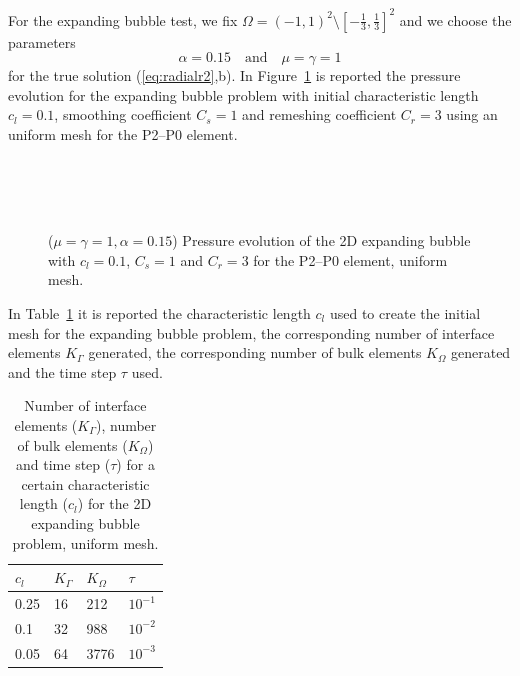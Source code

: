 \documentclass[a4paper,12pt,onecolumn]{article}
\begin{document}
For the expanding bubble test, we fix $\Omega = (-1,1)^2 \setminus [-\frac13,\frac13]^2$ and we choose the parameters
\begin{equation*}
\alpha = 0.15 \quad\text{and}\quad \mu = \gamma = 1
\end{equation*}
for the true solution (\ref{eq:radialr2},b). In Figure~\ref{fig:expanding_bubble} is reported the pressure evolution for the expanding bubble problem with initial characteristic length $c_l=0.1$, smoothing coefficient $C_s=1$ and remeshing coefficient $C_r=3$ using an uniform mesh for the P2--P0 element.

\begin{figure}[htbp]
  \centering
  \\
  \quad
  \\
  \quad
  \\
  \caption{($\mu=\gamma=1,\alpha = 0.15$) Pressure evolution of the 2D expanding bubble with $c_l=0.1$, $C_s=1$ and $C_r=3$ for the P2--P0 element, uniform mesh.}
  \label{fig:expanding_bubble}
\end{figure}

In Table~\ref{tab:expandingbubble2Delements} it is reported the characteristic length $c_l$ used to create the initial mesh for the expanding bubble problem, the corresponding number of interface elements $K_\Gamma$ generated, the corresponding number of bulk elements $K_\Omega$ generated and the time step $\tau$ used. 
\begin{table}
 \center
\begin{tabular}{llll}
\hline
$c_l$ & $K_\Gamma$ & $K_\Omega$ & $\tau$\\
\hline
0.25 & 16 & 212 & $10^{-1}$ \\
0.1 & 32 & 988 & $10^{-2}$ \\
0.05 & 64 & 3776 & $10^{-3}$ \\
\hline
\end{tabular}
\caption{Number of interface elements ($K_\Gamma$), number of bulk elements ($K_\Omega$) and time step ($\tau$) for a certain characteristic length ($c_l$) for the 2D expanding bubble problem, uniform mesh.}
\label{tab:expandingbubble2Delements}
\end{table}
\end{document}
